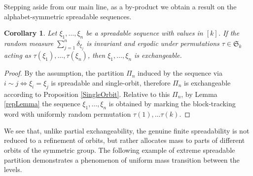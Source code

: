 \documentclass{article}
\newtheorem{corollary}[Theorem]{Corollary}
\begin{document}
Stepping aside from our main line,  as a by-product we obtain a result on the alphabet-symmetric spreadable sequences. 

\begin{corollary}\label{Cor1}
Let $\xi_1,\ldots,\xi_n$ be a spreadable sequence with values in $[k]$. If the random measure $\sum_{j=1}^n \delta_{\xi_j}$ is invariant and ergodic under permutations $\tau\in{\mathfrak S}_k$ acting
as $\tau(\xi_1),\ldots,\tau(\xi_n)$, then $\xi_1,\ldots,\xi_n$ is exchangeable.
\end{corollary}
\begin{proof}
By the assumption,
the partition $\Pi_n$ 
induced by the sequence via $i\sim j\Leftrightarrow\xi_i=\xi_j$
is spreadable and single-orbit, therefore $\Pi_n$ is exchangeable according to Proposition \ref{SingleOrbit}.
Relative to this $\Pi_n$,    by Lemma \ref{repLemma} the sequence $\xi_1,\ldots,\xi_n$ is obtained  by marking the block-tracking word with uniformly random permutation $\tau(1),\ldots  \tau(k)$.
\end{proof}





We see that, unlike partial exchangeability, the genuine finite spreadability is not reduced to a refinement of orbits, but rather allocates mass  to parts of different orbits of the symmetric group. The following example of extreme spreadable partition demonstrates a phenomenon of uniform mass transition between the levels.%
\end{document}
